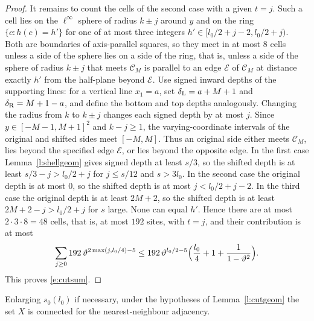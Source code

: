 \begin{proof}
It remains to count the cells of the second case with a given $t = j$. Such a cell lies on the $\ell^\infty$ sphere of radius $k \pm j$ around $y$ and on the ring $\{c : h(c) = h'\}$ for one of at most three integers $h' \in [l_0/2 + j - 2, l_0/2 + j)$. Both are boundaries of axis-parallel squares, so they meet in at most $8$ cells unless a side of the sphere lies on a side of the ring, that is, unless a side of the sphere of radius $k \pm j$ that meets $\mathcal C_M$ is parallel to an edge $\mathcal E$ of $\mathcal C_M$ at distance exactly $h'$ from the half-plane beyond $\mathcal E$. Use signed inward depths of the supporting lines: for a vertical line $x_1=a$, set $\delta_{\rm L}=a+M+1$ and $\delta_{\rm R}=M+1-a$, and define the bottom and top depths analogously. Changing the radius from $k$ to $k\pm j$ changes each signed depth by at most $j$. Since $y\in[-M-1,M+1]^2$ and $k-j\ge1$, the varying-coordinate intervals of the original and shifted sides meet $[-M,M]$. Thus an original side either meets $\mathcal C_M$, lies beyond the specified edge $\mathcal E$, or lies beyond the opposite edge. In the first case Lemma~\ref{l:shellgeom} gives signed depth at least $s/3$, so the shifted depth is at least $s/3-j>l_0/2+j$ for $j\le s/12$ and $s>3l_0$. In the second case the original depth is at most $0$, so the shifted depth is at most $j<l_0/2+j-2$. In the third case the original depth is at least $2M+2$, so the shifted depth is at least $2M+2-j>l_0/2+j$ for $s$ large. None can equal $h'$. Hence there are at most $2 \cdot 3 \cdot 8 = 48$ cells, that is, at most $192$ sites, with $t = j$, and their contribution is at most
\begin{equation*}
\sum_{j \ge 0} 192 \, \vartheta^{2 \max(j, l_0/4) - 5} \le 192 \, \vartheta^{l_0/2 - 5} \Bigl( \frac{l_0}{4} + 1 + \frac{1}{1 - \vartheta^2} \Bigr).
\end{equation*}
This proves \eqref{e:cutsum}.
\end{proof}

\begin{lemma}\label{l:Xconn}
Enlarging $s_0(l_0)$ if necessary, under the hypotheses of Lemma~\ref{l:cutgeom} the set $X$ is connected for the nearest-neighbour adjacency.
\end{lemma}

